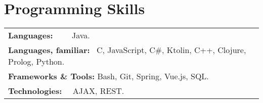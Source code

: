 \documentclass[letterpaper,10pt]{article}
\makeatletter
\newcommand{\tframed}[2][]{\tikz[baseline=(h.base)]\node[rndblock,#1] (h) {\color{black}{#2}};}
\newcommand*{\mystrut}{\rule[-0.2\baselineskip]{0pt}{0.8\baselineskip}}
\newcommand{\skill}[1]{\tframed[lightgray]{\mystrut#1}}
\newcommand{\resumeExpSubheading}[5]{
  \vspace{-1pt}\item
    \begin{tabular*}{0.97\textwidth}{l@{\extracolsep{\fill}}r}
      \textbf{#1}  & \textcolor{mygray}{#2} \\
      \textit{\small#3} & \textcolor{mygray}{\textit{\small #4}} \\
      {\scriptsize#5}
    \end{tabular*}\vspace{3pt}
}
\newcommand{\resumeSubHeadingListStart}{\begin{itemize}[leftmargin=*]}
\newcommand{\resumeSubHeadingListEnd}{\end{itemize}}
\newcommand{\resumeDesc}[1]{\begin{adjustwidth}{5pt}{0pt}\vspace{-2pt}{\small{#1}}\end{adjustwidth}}
\makeatother
\begin{document}
\vspace{-1pt}
\section{Programming Skills}
 \resumeSubHeadingListStart
 \begin{tabular}{ll}
\textbf{Languages:} \qquad\qquad\,\,\,\,\,\,\,\,\,\, Java. \\
\textbf{Languages, familiar:} \quad\, C, JavaScript, C\#, Ktolin, C++, Clojure, Prolog, Python. \\
\textbf{Frameworks \& Tools:} \quad Bash, Git, Spring, Vue.js, SQL. \\
\textbf{Technologies:} \qquad\qquad\,\,\,\, AJAX, REST.
\end{tabular}
 \resumeSubHeadingListEnd

    
    

  
\end{document}

